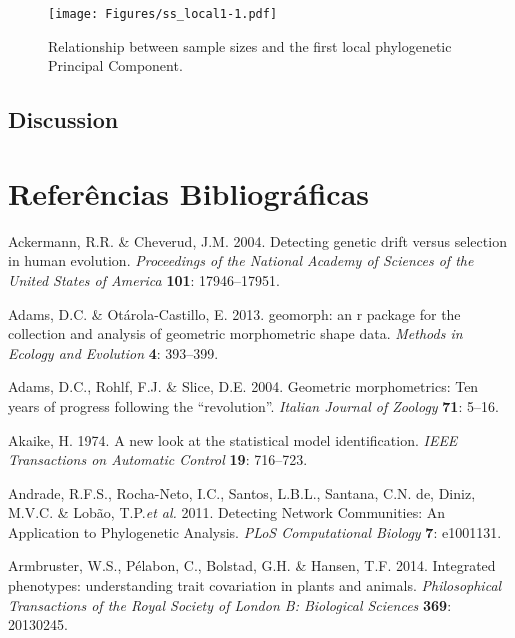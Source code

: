 \documentclass[12pt,twoside]{report}
\begin{document}
\begin{figure}[htbp]
\centering
\texttt{[image: Figures/ss\_local1-1.pdf]}
\caption{Relationship between sample sizes and the first local
phylogenetic Principal Component. \label{fig:ss_local1}}
\end{figure}

\section{Discussion}\label{discussion-2}

\def\sectionautorefname{Seção} \def\chapterautorefname{Capítulo}
\def\figureautorefname{Figura} \def\tableautorefname{Tabela}


\pagestyle{plain}

\chapter*{Referências Bibliográficas}


Ackermann, R.R. \& Cheverud, J.M. 2004. Detecting genetic drift versus
selection in human evolution. \emph{Proceedings of the National Academy
of Sciences of the United States of America} \textbf{101}: 17946--17951.

Adams, D.C. \& Otárola-Castillo, E. 2013. geomorph: an r package for the
collection and analysis of geometric morphometric shape data.
\emph{Methods in Ecology and Evolution} \textbf{4}: 393--399.

Adams, D.C., Rohlf, F.J. \& Slice, D.E. 2004. Geometric morphometrics:
Ten years of progress following the ``revolution''. \emph{Italian
Journal of Zoology} \textbf{71}: 5--16.

Akaike, H. 1974. A new look at the statistical model identification.
\emph{IEEE Transactions on Automatic Control} \textbf{19}: 716--723.

Andrade, R.F.S., Rocha-Neto, I.C., Santos, L.B.L., Santana, C.N. de,
Diniz, M.V.C. \& Lobão, T.P.\emph{et al.} 2011. Detecting Network
Communities: An Application to Phylogenetic Analysis. \emph{PLoS
Computational Biology} \textbf{7}: e1001131.

Armbruster, W.S., Pélabon, C., Bolstad, G.H. \& Hansen, T.F. 2014.
Integrated phenotypes: understanding trait covariation in plants and
animals. \emph{Philosophical Transactions of the Royal Society of London
B: Biological Sciences} \textbf{369}: 20130245.
\end{document}
